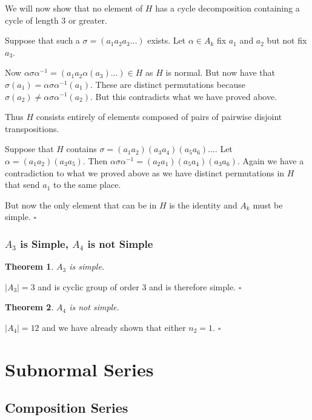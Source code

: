 \documentclass[10pt]{article}
\newtheorem{theorem}{Theorem}[section]
\newenvironment{proof}[1][Proof]{\begin{trivlist}
\item[\hskip \labelsep {\itshape #1}]}{\end{trivlist}}
\begin{document}
\begin{proof}
We will now show that no element of $H$ has a cycle decomposition containing a cycle of length $3$ or greater.

Suppose that such a $\sigma = (a_1 a_2 a_3 \ldots)$ exists. Let $\alpha \in A_k$ fix $a_1$ and $a_2$ but not fix $a_3$.

Now $\alpha\sigma\alpha^{-1} = (a_1 a_2 \alpha(a_3) \ldots) \in H$ as $H$ is normal. But now have that $\sigma(a_1) = \alpha\sigma\alpha^{-1}(a_1)$. These are distinct permutations because $\sigma(a_2) \neq \alpha\sigma\alpha^{-1}(a_2)$. But this contradicts what we have proved above.

Thus $H$ consists entirely of elements composed of pairs of pairwise disjoint transpositions.

Suppose that $H$ contains $\sigma = (a_1 a_2)(a_3 a_4)(a_5 a_6)\ldots$. Let $\alpha = (a_1 a_2)(a_3 a_5)$. Then $\alpha\sigma\alpha^{-1} = (a_2 a_1)(a_5 a_4)(a_3 a_6)$. Again we have a contradiction to what we proved above as we have distinct permutations in $H$ that send $a_1$ to the same place.

But now the only element that can be in $H$ is the identity and $A_k$ must be simple. $\square$
\end{proof}

\subsubsection{$A_3$ is Simple, $A_4$ is not Simple}

\begin{theorem}
$A_3$ is simple.
\end{theorem}

\begin{proof}
$|A_3| = 3$ and is  cyclic group of order $3$ and is therefore simple. $\square$
\end{proof}

\begin{theorem}
$A_4$ is not simple.
\end{theorem}

\begin{proof}
$|A_4| = 12$ and we have already shown that either $n_2 = 1$. $\square$
\end{proof}

\section{Subnormal Series}

\subsection{Composition Series}
\end{document}
